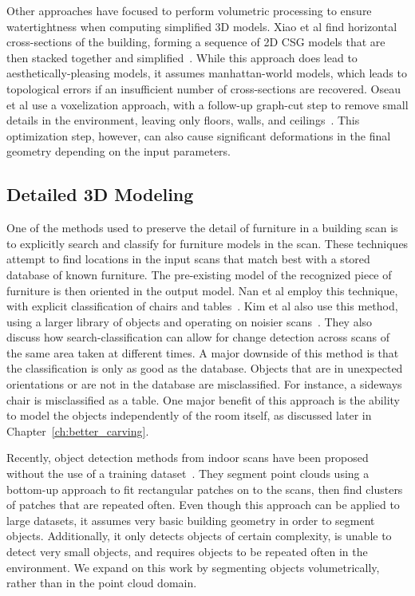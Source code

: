 \documentclass[12pt,onecolumn,oneside]{book}
\begin{document}
Other approaches have focused to perform volumetric processing to ensure watertightness when computing simplified 3D models.  Xiao et al find horizontal cross-sections of the building, forming a sequence of 2D CSG models that are then stacked together and simplified~\cite{Museums}.  While this approach does lead to aesthetically-pleasing models, it assumes manhattan-world models, which leads to topological errors if an insufficient number of cross-sections are recovered.  Oseau et al use a voxelization approach, with a follow-up graph-cut step to remove small details in the environment, leaving only floors, walls, and ceilings~\cite{Oesau13}.  This optimization step, however, can also cause significant deformations in the final geometry depending on the input parameters. 

\subsection{Detailed 3D Modeling}
\label{ssec:background_3dmodeling}

One of the methods used to preserve the detail of furniture in a building scan is to explicitly search and classify for furniture models in the scan.  These techniques attempt to find locations in the input scans that match best with a stored database of known furniture.  The pre-existing model of the recognized piece of furniture is then oriented in the output model.  Nan et al employ this technique, with explicit classification of chairs and tables~\cite{SearchClassifyPointcloud}.  Kim et al also use this method, using a larger library of objects and operating on noisier scans~\cite{Kim12}.  They also discuss how search-classification can allow for change detection across scans of the same area taken at different times.  A major downside of this method is that the classification is only as good as the database.  Objects that are in unexpected orientations or are not in the database are misclassified.  For instance, a sideways chair is misclassified as a table.  One major benefit of this approach is the ability to model the objects independently of the room itself, as discussed later in Chapter~\ref{ch:better_carving}.  

Recently, object detection methods from indoor scans have been proposed without the use of a training dataset~\cite{Mattausch14}.  They segment point clouds using a bottom-up approach to fit rectangular patches on to the scans, then find clusters of patches that are repeated often.  Even though this approach can be applied to large datasets, it assumes very basic building geometry in order to segment objects.  Additionally, it only detects objects of certain complexity, is unable to detect very small objects, and requires objects to be repeated often in the environment.  We expand on this work by segmenting objects volumetrically, rather than in the point cloud domain.
\end{document}
